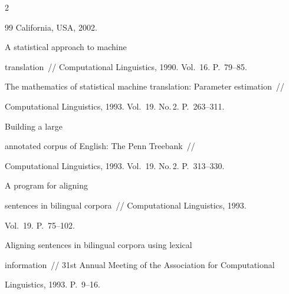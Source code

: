 \begin{multicols}{2}
{{\begin{thebibliography}{99}
California, USA, 2002.









A statistical approach to machine


translation~// Computational Linguistics, 1990. Vol.~16. P.~79--85.









The mathematics of statistical machine translation: Parameter estimation~//


Computational Linguistics, 1993. Vol.~19. No.\,2. P.~263--311.









Building a large


annotated corpus of English: The Penn Treebank~//


Computational Linguistics, 1993. Vol.~19. No.\,2. P.~313--330.









A program for aligning


sentences in bilingual corpora~// Computational Linguistics, 1993.


Vol.~19. P.~75--102.







 Aligning sentences in bilingual corpora using lexical 


information~// 31st Annual Meeting of the Association for Computational 


Linguistics, 1993. P.~9--16.


{%





}
\end{thebibliography}}}
\end{multicols}

